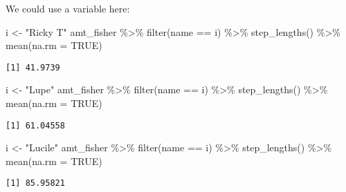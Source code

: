 \documentclass[ignorenonframetext,,t]{beamer}
\newenvironment{Shaded}{\begin{snugshade}}{\end{snugshade}}
\newcommand{\AttributeTok}[1]{\textcolor[rgb]{0.77,0.63,0.00}{#1}}
\newcommand{\ConstantTok}[1]{\textcolor[rgb]{0.00,0.00,0.00}{#1}}
\newcommand{\FunctionTok}[1]{\textcolor[rgb]{0.00,0.00,0.00}{#1}}
\newcommand{\NormalTok}[1]{#1}
\newcommand{\OtherTok}[1]{\textcolor[rgb]{0.56,0.35,0.01}{#1}}
\newcommand{\SpecialCharTok}[1]{\textcolor[rgb]{0.00,0.00,0.00}{#1}}
\newcommand{\StringTok}[1]{\textcolor[rgb]{0.31,0.60,0.02}{#1}}
\begin{document}
\begin{frame}[fragile]
We could use a variable here:

\begin{Shaded}
\begin{Highlighting}[]
\NormalTok{i }\OtherTok{\textless{}{-}} \StringTok{"Ricky T"}
\NormalTok{amt\_fisher }\SpecialCharTok{\%\textgreater{}\%} \FunctionTok{filter}\NormalTok{(name }\SpecialCharTok{==}\NormalTok{ i) }\SpecialCharTok{\%\textgreater{}\%} 
  \FunctionTok{step\_lengths}\NormalTok{() }\SpecialCharTok{\%\textgreater{}\%} \FunctionTok{mean}\NormalTok{(}\AttributeTok{na.rm =} \ConstantTok{TRUE}\NormalTok{)}
\end{Highlighting}
\end{Shaded}

\begin{verbatim}
[1] 41.9739
\end{verbatim}

\begin{Shaded}
\begin{Highlighting}[]
\NormalTok{i }\OtherTok{\textless{}{-}} \StringTok{"Lupe"}
\NormalTok{amt\_fisher }\SpecialCharTok{\%\textgreater{}\%} \FunctionTok{filter}\NormalTok{(name }\SpecialCharTok{==}\NormalTok{ i) }\SpecialCharTok{\%\textgreater{}\%} 
  \FunctionTok{step\_lengths}\NormalTok{() }\SpecialCharTok{\%\textgreater{}\%} \FunctionTok{mean}\NormalTok{(}\AttributeTok{na.rm =} \ConstantTok{TRUE}\NormalTok{)}
\end{Highlighting}
\end{Shaded}

\begin{verbatim}
[1] 61.04558
\end{verbatim}

\begin{Shaded}
\begin{Highlighting}[]
\NormalTok{i }\OtherTok{\textless{}{-}} \StringTok{"Lucile"}
\NormalTok{amt\_fisher }\SpecialCharTok{\%\textgreater{}\%} \FunctionTok{filter}\NormalTok{(name }\SpecialCharTok{==}\NormalTok{ i) }\SpecialCharTok{\%\textgreater{}\%} 
  \FunctionTok{step\_lengths}\NormalTok{() }\SpecialCharTok{\%\textgreater{}\%} \FunctionTok{mean}\NormalTok{(}\AttributeTok{na.rm =} \ConstantTok{TRUE}\NormalTok{)}
\end{Highlighting}
\end{Shaded}

\begin{verbatim}
[1] 85.95821
\end{verbatim}
\end{frame}
\end{document}
